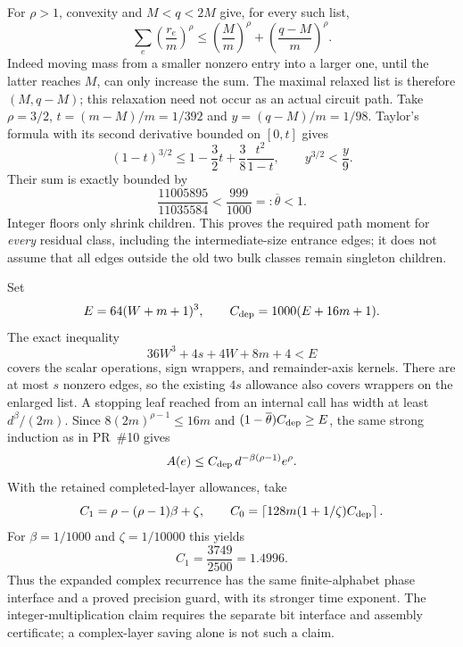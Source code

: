 For $\rho>1$, convexity and $M<q<2M$ give, for every such list,
\[
 \sum_e\left(\frac{r_e}{m}\right)^\rho
 \le\left(\frac M m\right)^\rho
       +\left(\frac{q-M}{m}\right)^\rho.
\]
Indeed moving mass from a smaller nonzero entry into a larger one, until
the latter reaches $M$, can only increase the sum. The maximal relaxed
list is therefore $(M,q-M)$; this relaxation need not occur as an actual
circuit path.
Take $\rho=3/2$, $t=(m-M)/m=1/392$ and $y=(q-M)/m=1/98$. Taylor's formula
with its second derivative bounded on $[0,t]$ gives
\[
 (1-t)^{3/2}\le1-\frac32t+\frac38\frac{t^2}{1-t},
 \qquad y^{3/2}<\frac y9.
\]
Their sum is exactly bounded by
\[
 \frac{11005895}{11035584}<\frac{999}{1000}=:\overline\theta<1.
\]
Integer floors only shrink children. This proves the required path moment
for \emph{every} residual class, including the intermediate-size entrance
edges; it does not assume that all edges outside the old two bulk classes
remain singleton children.

Set
\[
 E=64(W+m+1)^3,\qquad C_{\rm dep}=1000(E+16m+1).
\]
The exact inequality
\[
 36W^3+4s+4W+8m+4<E
\]
covers the scalar operations, sign wrappers, and remainder-axis kernels.
There are at most $s$ nonzero edges, so the existing $4s$ allowance also
covers wrappers on the enlarged list. A stopping leaf reached from an
internal call has width at least $d^\beta/(2m)$. Since
$8(2m)^{\rho-1}\le16m$ and
$(1-\overline\theta)C_{\rm dep}\ge E$, the same strong induction as in
PR~\#10 gives
\[
 A(e)\le C_{\rm dep}\,d^{-\beta(\rho-1)}e^\rho.
\]
With the retained completed-layer allowances, take
\[
 C_1=\rho-(\rho-1)\beta+\zeta,
 \qquad
 C_0=\left\lceil128m(1+1/\zeta)C_{\rm dep}\right\rceil.
\]
For $\beta=1/1000$ and $\zeta=1/10000$ this yields
\[
 C_1=\frac{3749}{2500}=1.4996.
\]
Thus the expanded complex recurrence has the same finite-alphabet phase
interface and a proved precision guard, with its stronger time exponent.
The integer-multiplication claim requires the separate bit interface and
assembly certificate; a complex-layer saving alone is not such a claim.
